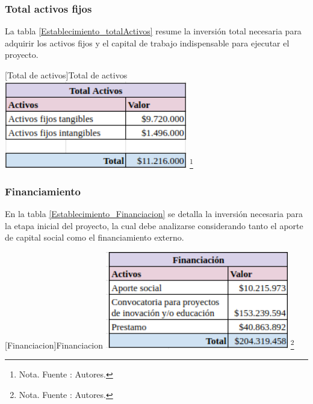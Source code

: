 \subsubsection{Total activos fijos}
La tabla \ref{Establecimiento_totalActivos} resume la inversión total necesaria para adquirir los activos fijos y el capital de trabajo indispensable para ejecutar el proyecto.

\vspace{2mm}
        \begin{minipage}{0.9\textwidth}
        \centering
        [{Total de activos}]{Total de activos}
        \label{Establecimiento_totalActivos}
        \includegraphics[width=0.6\textwidth]{Content/Images/AF/Establecimiento_totalActivos.png}
        \footnote{Nota. \textup{Fuente : Autores.}}
        \end{minipage}

\subsubsection{Financiamiento}
En la tabla \ref{Establecimiento_Financiacion} se detalla la inversión necesaria para la etapa inicial del proyecto, la cual debe analizarse considerando tanto el aporte de capital social como el financiamiento externo.

\vspace{2mm}
        \begin{minipage}{0.9\textwidth}
        \centering
        [{Financiacion}]{Financiacion}
        \label{Establecimiento_Financiacion}
        \includegraphics[width=0.6\textwidth]{Content/Images/AF/Establecimiento_Financiacion.png}
        \footnote{Nota. \textup{Fuente : Autores.}}
        \end{minipage}
